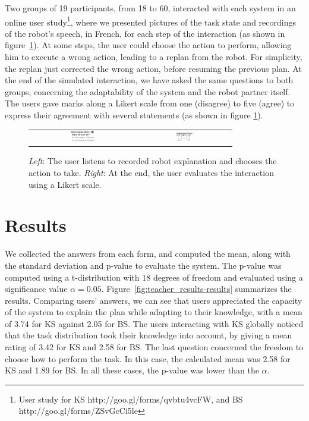 Two groups of 19 participants, from 18 to 60, interacted with each system in an online user study\footnote{User study for KS http://goo.gl/forms/qvbtu4vcFW, and BS http://goo.gl/forms/ZSvGcCi5le}, where we presented pictures of the task state and recordings of the robot's speech, in French, for each step of the interaction (as shown in figure~\ref{fig:teacher_results-user_study}).
At some steps, the user could choose the action to perform, allowing him to execute a wrong action, leading to a replan from the robot. For simplicity, the replan just corrected the wrong action, before resuming the previous plan. 
At the end of the simulated interaction, we have asked the same questions to both groups, concerning the adaptability of the system and the robot partner itself. 
The users gave marks along a Likert scale from one (disagree) to five (agree) to express their agreement with several statements (as shown in figure \ref{fig:teacher_results-user_study}).

\begin{figure}[ht!]
 \centering
 \begin{tabular}{cc}
  \includegraphics[width=0.24\textwidth]{img/teacher/ustudy9.png} &
  \includegraphics[width=0.19\textwidth]{img/teacher/ustudy11.png}
 \end{tabular} 
 \caption[User studies on plan adaptation]{\textit{Left}: The user listens to recorded robot explanation and chooses the action to take. \textit{Right}: At the end, the user evaluates the interaction using a Likert scale.}
 \label{fig:teacher_results-user_study}
 \end{figure}

\section{Results}

We collected the answers from each form, and computed the mean, along with the standard deviation and p-value to evaluate the system. The p-value was computed using a t-distribution with 18 degrees of freedom and evaluated using a significance value $\alpha=0.05$.
Figure~\ref{fig:teacher_results-results} summarizes the results. Comparing users' answers, we can see that users appreciated the capacity of the system to explain the plan while adapting to their knowledge, with a mean of 3.74 for KS against 2.05 for BS. The users interacting with KS globally noticed that the task distribution took their knowledge into account, by giving a mean rating of 3.42 for KS and 2.58 for BS. The last question concerned the freedom to choose how to perform the task. In this case, the calculated mean was 2.58 for KS and 1.89 for BS. In all these cases, the p-value was lower than the $\alpha$. 

